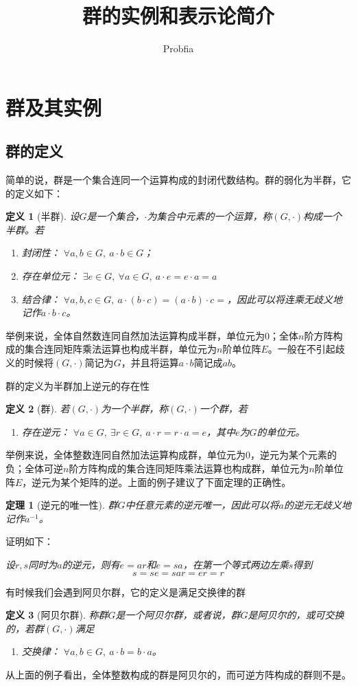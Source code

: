 \documentclass[a4paper,11pt]{ctexart}
\title{群的实例和表示论简介}
\author{Probfia}
\newcommand{\beq}{\begin{equation}}
\newcommand{\eeq}{\end{equation}}
\newtheorem{thm}{定理}[section]
\newtheorem{dfn}{定义}[section]
\begin{document}
\maketitle
\tableofcontents

\section{群及其实例}
\subsection{群的定义}
简单的说，群是一个集合连同一个运算构成的封闭代数结构。群的弱化为半群，它的定义如下：
\begin{dfn}[半群]
设$G$是一个集合，$\cdot$为集合中元素的一个运算，称$(G,\cdot)$构成一个半群。若
\begin{enumerate}
\item 封闭性： $\forall a,b \in G,\ a \cdot b \in G$；
\item 存在单位元： $\exists e \in G, \ \forall a \in G,\ a\cdot e = e \cdot a = a$
\item 结合律： $\forall a,b,c \in G,\ a\cdot(b\cdot c) = (a \cdot b) \cdot c =$，因此可以将连乘无歧义地记作$a\cdot b\cdot c$。
\end{enumerate}
\end{dfn}
举例来说，全体自然数连同自然加法运算构成半群，单位元为$0$；全体$n$阶方阵构成的集合连同矩阵乘法运算也构成半群，单位元为$n$阶单位阵$E$。一般在不引起歧义的时候将$(G,\cdot)$简记为$G$，并且将运算$a \cdot b$简记成$ab$。
\par
群的定义为半群加上逆元的存在性
\begin{dfn}[群]
若$(G,\cdot)$为一个半群，称$(G,\cdot)$一个群，若
\begin{enumerate}
\item 存在逆元： $\forall a \in G,\ \exists r \in G,\ a\cdot r = r\cdot a = e$，其中$e$为$G$的单位元。
\end{enumerate}
\end{dfn}
举例来说，全体整数连同自然加法运算构成群，单位元为$0$，逆元为某个元素的负；全体可逆$n$阶方阵构成的集合连同矩阵乘法运算也构成群，单位元为$n$阶单位阵$E$，逆元为某个矩阵的逆。上面的例子建议了下面定理的正确性。
\begin{thm}[逆元的唯一性]
群$G$中任意元素的逆元唯一，因此可以将$a$的逆元无歧义地记作$a^{-1}$。
\end{thm}
证明如下：\par
\emph{设$r,s$同时为$a$的逆元，则有$e = ar$和$e = sa$，在第一个等式两边左乘$s$得到
\beq
s = se = sar = er = r
\eeq
}
\par
有时候我们会遇到阿贝尔群，它的定义是满足交换律的群
\begin{dfn}[阿贝尔群]
称群$G$是一个阿贝尔群，或者说，群$G$是阿贝尔的，或可交换的，若群$(G,\cdot)$满足
\begin{enumerate}
\item 交换律： $\forall a,b \in G,\ a\cdot b = b \cdot a$。
\end{enumerate}
\end{dfn}
从上面的例子看出，全体整数构成的群是阿贝尔的，而可逆方阵构成的群则不是。
\end{document}
